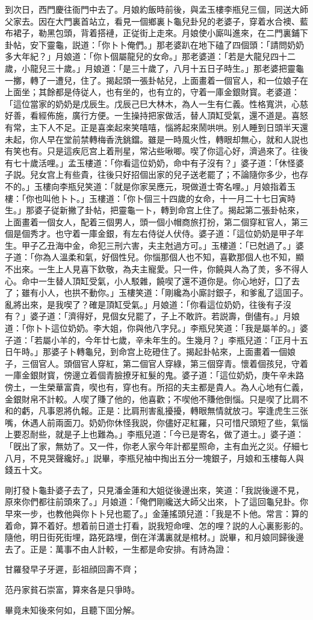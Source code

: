 到次日，西門慶往衙門中去了。月娘約飯時前後，與孟玉樓李瓶兒三個，同送大師父家去。因在大門裏首站立，看見一個鄉裏卜龜兒卦兒的老婆子，穿着水合襖、藍布裙子，勒黑包頭，背着搭褳，正従街上走來。月娘使小廝叫進來，在二門裏鋪下卦帖，安下靈龜，説道：「你卜卜俺們。」那老婆趴在地下磕了四個頭：「請問奶奶多大年紀？」月娘道：「你卜個屬龍兒的女命。」那老婆道：「若是大龍兒四十二歲，小龍兒三十歲。」月娘道：「是三十歲了，八月十五日子時生。」那老婆把靈龜一擲，轉了一遭兒，住了。揭起頭一張卦帖兒，上面畫着一個官人，和一位娘子在上面坐；其餘都是侍従人，也有坐的，也有立的，守着一庫金銀財寳。老婆道：「這位當家的奶奶是戊辰生。戊辰己巳大林木，為人一生有仁義。性格寬洪，心慈好善，看經佈施，廣行方便。一生操持把家做活，替人頂缸受氣，還不道是。喜怒有常，主下人不足。正是喜楽起來笑嘻嘻，惱將起來鬧哄哄。别人睡到日頭半天還未起，你人早在堂前禁轉梅香洗銚鐺。雖是一時風火性，轉眼却無心，就和人説也有笑也有。只是這疾厄宫上着刑星，常沾些啾唧。喫了你這心好，濟過來了。往後有七十歲活哩。」孟玉樓道：「你看這位奶奶，命中有子沒有？」婆子道：「休怪婆子説。兒女宫上有些貴，往後只好招個出家的兒子送老罷了；不論隨你多少，也存不的。」玉樓向李瓶兒笑道：「就是你家吴應元，現做道士寄名哩。」月娘指着玉樓：「你也叫他卜卜。」玉樓道：「你卜個三十四歲的女命，十一月二十七日寅時生。」那婆子従新撇了卦帖，把靈龜一卜，轉到命宫上住了。揭起第二張卦帖來，上面畫着一個女人，配着三個男人，頭一個小帽商旅打扮，第二個穿紅官人，第三個是個秀才。也守着一庫金銀，有左右侍従人伏侍。婆子道：「這位奶奶是甲子年生。甲子乙丑海中金，命犯三刑六害，夫主尅過方可。」玉樓道：「已尅過了。」婆子道：「你為人溫柔和氣，好個性兒。你惱那個人也不知，喜歡那個人也不知，顯不出來。一生上人見喜下欽敬，為夫主寵愛。只一件，你饒與人為了羙，多不得人心。命中一生替人頂缸受氣，小人駁雜，饒喫了還不道你是。你心地好，囗了去了；雖有小人，也拱不動你。」玉樓笑道：「剛纔為小廝討銀子，和爹亂了這囬子。亂將出來，是我喫了？確是頂缸受氣。」月娘道：「你看這位奶奶，往後有子沒有？」婆子道：「濟得好，見個女兒罷了，子上不敢許。若説壽，倒儘有。」月娘道：「你卜卜這位奶奶。李大姐，你與他八字兒。」李瓶兒笑道：「我是屬羊的。」婆子道：「若屬小羊的，今年廿七歲，辛未年生的。生幾月？」李瓶兒道：「正月十五日午時。」那婆子卜轉龜兒，到命宫上矻磴住了。揭起卦帖來，上面畫着一個娘子，三個官人。頭個官人穿紅，第二個官人穿綠，第三個穿青。懷着個孩兒，守着一庫金銀財寳，傍邊立着個青臉撩牙紅髮的鬼。婆子道：「這位奶奶，庚午辛未路傍土，一生榮華富貴，喫也有，穿也有。所招的夫主都是貴人。為人心地有仁義，金銀財帛不計較。人喫了賺了他的，他喜歡；不喫他不賺他倒惱。只是喫了比肩不和的虧，凡事恩將仇報。正是：比肩刑害亂擾擾，轉眼無情就放刁。寜逢虎生三张嘴，休遇人前兩面刀。奶奶你休怪我説，你儘好疋紅羅，只可惜尺頭短了些，氣惱上要忍耐些，就是子上也難為。」李瓶兒道：「今已是寄名，做了道士。」婆子道：「旣出了家，無妨了。又一件，你老人家今年計都星照命，主有血光之災。仔細七八月，不見哭聲纔好。」説畢，李瓶兒袖中掏出五分一塊銀子，月娘和玉樓每人與錢五十文。

剛打發卜龜卦婆子去了，只見潘金蓮和大姐従後邊出來，笑道：「我説後邊不見，原來你們都往前頭來了。」月娘道：「俺們剛纔送大師父出來，卜了這回龜兒卦。你早來一步，也教他與你卜卜兒也罷了。」金蓮搖頭兒道：「我是不卜他。常言：算的着命，算不着好。想着前日道士打看，説我短命哩、怎的哩？説的人心裏影影的。隨他，明日街死街埋，路死路埋，倒在洋溝裏就是棺材。」説畢，和月娘同歸後邊去了。正是：萬事不由人計較，一生都是命安排。有詩為證：

\begin{myquote}
甘羅發早子牙遲，彭祖顔回壽不齊；

范丹家貧石崇富，算來各是只爭時。
\end{myquote}

畢竟未知後來何如，且聽下囬分解。

